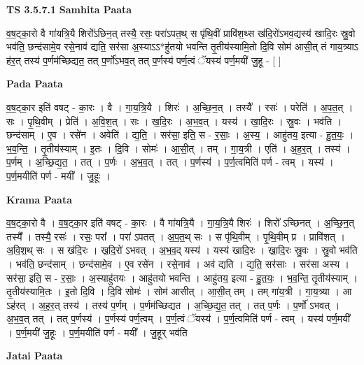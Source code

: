\documentclass[17pt]{extarticle}
\begin{document}
\textbf{TS 3.5.7.1 } \newline
\textbf{Samhita Paata} \newline

व॒ष॒ट्का॒रो वै गा॑यत्रि॒यै शिरो᳚ऽछिन॒त् तस्यै॒ रसः॒ परा॑ऽपत॒थ् स पृ॑थि॒वीं प्रावि॑श॒थ्स ख॑दि॒रो॑ऽभव॒द्यस्य॑ खादि॒रः स्रु॒वो भव॑ति॒ छन्द॑सामे॒व रसे॒नाव॑ द्यति॒ सर॑सा अ॒स्याऽऽ*हु॑तयो भवन्ति तृ॒तीय॑स्यामि॒तो दि॒वि सोम॑ आसी॒त् तं गाय॒त्र्याऽ ह॑र॒त् तस्य॑ प॒र्णम॑च्छिद्यत॒ तत् प॒र्णो॑ऽभव॒त् तत् प॒र्णस्य॑ पर्ण॒त्वं ॅयस्य॑ पर्ण॒मयी॑ जु॒हू - [  ] \newline

\textbf{Pada Paata} \newline

व॒ष॒ट्का॒र इति॑ वषट् - का॒रः । वै । गा॒य॒त्रि॒यै । शिरः॑ । अ॒च्छि॒न॒त् । तस्यै᳚ । रसः॑ । परेति॑ । अ॒प॒त॒त् । सः । पृ॒थि॒वीम् । प्रेति॑ । अ॒वि॒श॒त् । सः । ख॒दि॒रः । अ॒भ॒व॒त् । यस्य॑ । खा॒दि॒रः । स्रु॒वः । भव॑ति । छन्द॑साम् । ए॒व । रसे॑न । अवेति॑ । द्य॒ति॒ । सर॑सा॒ इति॒ स - र॒साः॒ । अ॒स्य॒ । आहु॑तय॒ इत्या - हु॒त॒यः॒ । भ॒व॒न्ति॒ । तृ॒तीय॑स्याम् । इ॒तः । दि॒वि । सोमः॑ । आ॒सी॒त् । तम् । गा॒य॒त्री । एति॑ । अ॒ह॒र॒त् । तस्य॑ । प॒र्णम् । अ॒च्छि॒द्य॒त॒ । तत् । प॒र्णः । अ॒भ॒व॒त् । तत् । प॒र्णस्य॑ । प॒र्ण॒त्वमिति॑ पर्ण - त्वम् । यस्य॑ । प॒र्ण॒मयीति॑ पर्ण - मयी᳚ । जु॒हूः ।  \newline


\textbf{Krama Paata} \newline

व॒ष॒ट्का॒रो वै । व॒ष॒ट्का॒र इति॑ वषट् - का॒रः । वै गा॑यत्रि॒यै । गा॒य॒त्रि॒यै शिरः॑ । शिरो᳚ ऽच्छिनत् । अ॒च्छि॒न॒त् तस्यै᳚ । तस्यै॒ रसः॑ । रसः॒ परा᳚ । परा॑ ऽपतत् । अ॒प॒त॒थ् सः । स पृ॑थि॒वीम् । पृ॒थि॒वीम् प्र । प्रावि॑शत् । अ॒वि॒श॒थ् सः । स ख॑दि॒रः । ख॒दि॒रो॑ ऽभवत् । अ॒भ॒व॒द् यस्य॑ । यस्य॑ खादि॒रः । खा॒दि॒रः स्रु॒वः । स्रु॒वो भव॑ति । भव॑ति॒ छन्द॑साम् । छन्द॑सामे॒व । ए॒व रसे॑न । रसे॒नाव॑ । अव॑ द्यति । द्य॒ति॒ सर॑साः । सर॑सा अस्य । सर॑सा॒ इति॒ स - र॒साः॒ । अ॒स्याहु॑तयः । आहु॑तयो भवन्ति । आहु॑तय॒ इत्या - हु॒त॒यः॒ । भ॒व॒न्ति॒ तृ॒तीय॑स्याम् । तृ॒तीय॑स्यामि॒तः । इ॒तो दि॒वि । दि॒वि सोमः॑ । सोम॑ आसीत् । आ॒सी॒त् तम् । तम् गा॑य॒त्री । गा॒य॒त्र्या । आ ऽह॑रत् । अ॒ह॒र॒त् तस्य॑ । तस्य॑ प॒र्णम् । प॒र्णम॑च्छिद्यत । अ॒च्छि॒द्य॒त॒ तत् । तत् प॒र्णः । प॒र्णो॑ ऽभवत् । अ॒भ॒व॒त् तत् । तत् प॒र्णस्य॑ । प॒र्णस्य॑ पर्ण॒त्वम् । प॒र्ण॒त्वं ॅयस्य॑ । प॒र्ण॒त्वमिति॑ पर्ण - त्वम् । यस्य॑ पर्ण॒मयी᳚ । प॒र्ण॒मयी॑ जु॒हूः । प॒र्ण॒मयीति॑ पर्ण - मयी᳚ । जु॒हूर् भव॑ति \newline

\textbf{Jatai Paata} \newline
\end{document}
